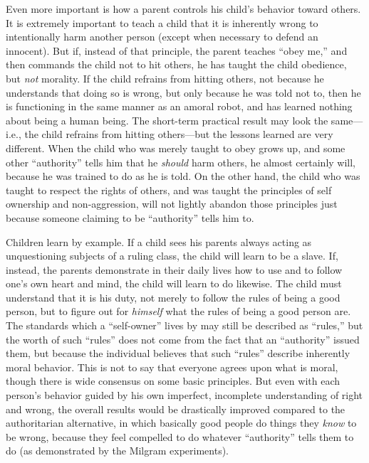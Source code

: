 \documentclass{book}
\begin{document}
Even more important is how a parent controls his child's behavior toward others. It is extremely important to teach a child that it is inherently wrong to intentionally harm another person (except when necessary to defend an innocent). But if, instead of that principle, the parent teaches \enquote{obey me,} and then commands the child not to hit others, he has taught the child obedience, but \emph{not} morality. If the child refrains from hitting others, not because he understands that doing so is wrong, but only because he was told not to, then he is functioning in the same manner as an amoral robot, and has learned nothing about being a human being. The short-term practical result may look the same---i.e., the child refrains from hitting others---but the lessons learned are very different. When the child who was merely taught to obey grows up, and some other \enquote{authority} tells him that he \emph{should} harm others, he almost certainly will, because he was trained to do as he is told. On the other hand, the child who was taught to respect the rights of others, and was taught the principles of self ownership and non-aggression, will not lightly abandon those principles just because someone claiming to be \enquote{authority} tells him to.

Children learn by example. If a child sees his parents always acting as unquestioning subjects of a ruling class, the child will learn to be a slave. If, instead, the parents demonstrate in their daily lives how to use and to follow one's own heart and mind, the child will learn to do likewise. The child must understand that it is his duty, not merely to follow the rules of being a good person, but to figure out for \emph{himself} what the rules of being a good person are. The standards which a \enquote{self-owner} lives by may still be described as \enquote{rules,} but the worth of such \enquote{rules} does not come from the fact that an \enquote{authority} issued them, but because the individual believes that such \enquote{rules} describe inherently moral behavior. This is not to say that everyone agrees upon what is moral, though there is wide consensus on some basic principles. But even with each person's behavior guided by his own imperfect, incomplete understanding of right and wrong, the overall results would be drastically improved compared to the authoritarian alternative, in which basically good people do things they \emph{know} to be wrong, because they feel compelled to do whatever \enquote{authority} tells them to do (as demonstrated by the Milgram experiments).
\end{document}
